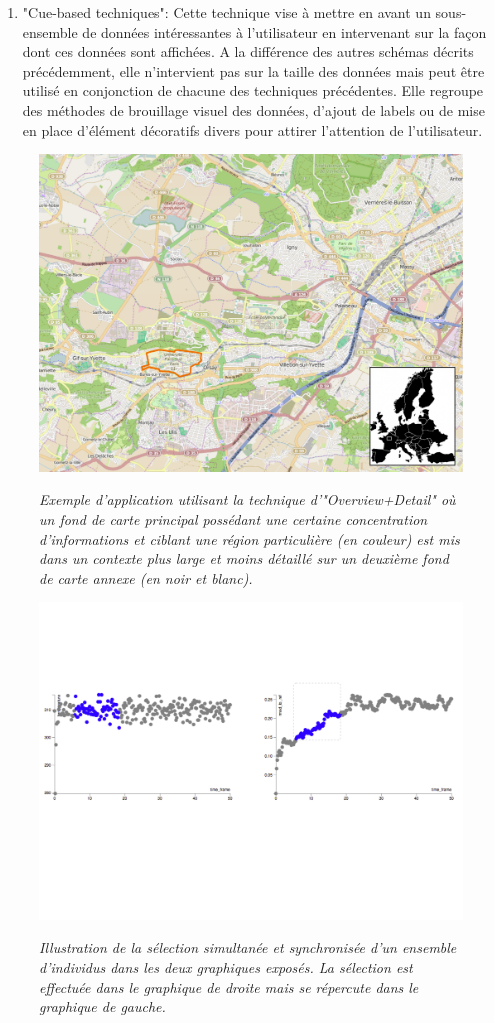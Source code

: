 \begin{enumerate}
    \item "Cue-based techniques": Cette technique vise à mettre en avant un sous-ensemble de données intéressantes à l'utilisateur en intervenant sur la façon dont ces données sont affichées. A la différence des autres schémas décrits précédemment, elle n'intervient pas sur la taille des données mais peut être utilisé en conjonction de chacune des techniques précédentes. Elle regroupe des méthodes de brouillage visuel des données, d'ajout de labels ou de mise en place d'élément décoratifs divers pour attirer l'attention de l'utilisateur.
\end{enumerate}

\begin{figure}
  \centering
  {\includegraphics[width=.65\linewidth]{./figures/ch2/ch2_overview+detail}}
    \caption{{\it Exemple d'application utilisant la technique d'"Overview+Detail" où un fond de carte principal possédant une certaine concentration d'informations et ciblant une région particulière (en couleur) est mis dans un contexte plus large et moins détaillé sur un deuxième fond de carte annexe (en noir et blanc).}}
  \label{Fig:overview+detail}
  \hspace{0.3cm}
\end{figure}

\begin{figure}
  \centering
  {\includegraphics[width=.75\linewidth]{./figures/ch2/ch2_focus+context}}
    \caption{{\it Illustration de la sélection simultanée et synchronisée d'un ensemble d'individus dans les deux graphiques exposés. La sélection est effectuée dans le graphique de droite mais se répercute dans le graphique de gauche.}}
  \label{Fig:focus+context}
  \hspace{0.3cm}
\end{figure}


